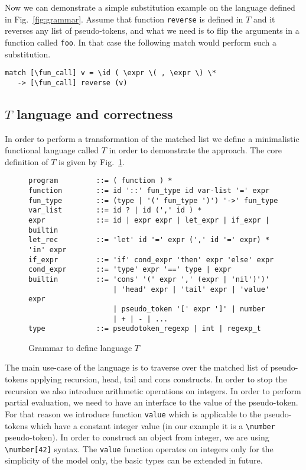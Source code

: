 Now we can demonstrate a simple substitution example on the language
defined in Fig.~\ref{fig:grammar}.  Assume that function \verb|reverse|
is defined in $T$ and it reverses any list of pseudo-tokens, and what
we need is to flip the arguments in a function called \verb|foo|.  In
that case the following match would perform such a substitution.
\begin{verbatim}
match [\fun_call] v = \id ( \expr \( , \expr \) \*
   -> [\fun_call] reverse (v)
\end{verbatim}

\subsection{$T$ language and correctness}
In order to perform a transformation of the matched list we define a
minimalistic functional language called $T$ in order to demonstrate
the approach.  The core definition of $T$ is given by Fig.~\ref{fig:t}.

\begin{figure}
\begin{verbatim}
program         ::= ( function ) *
function        ::= id '::' fun_type id var-list '=' expr
fun_type        ::= (type | '(' fun_type ')') '->' fun_type
var_list        ::= id ? | id (',' id ) *
expr            ::= id | expr expr | let_expr | if_expr | builtin
let_rec         ::= 'let' id '=' expr (',' id '=' expr) * 'in' expr
if_expr         ::= 'if' cond_expr 'then' expr 'else' expr
cond_expr       ::= 'type' expr '==' type | expr
builtin         ::= 'cons' '(' expr ',' (expr | 'nil')')' 
                    | 'head' expr | 'tail' expr | 'value' expr
                    | pseudo_token '[' expr ']' | number
                    | + | - | ...
type            ::= pseudotoken_regexp | int | regexp_t
\end{verbatim}
\caption{\label{fig:t}Grammar to define language $T$}
\end{figure}

The main use-case of the language is to traverse over the matched
list of pseudo-tokens applying recursion, head, tail and cons
constructs.  In order to stop the recursion we also introduce
arithmetic operations on integers.  In order to perform partial
evaluation, we need to have an interface to the value of the
pseudo-token.  For that reason we introduce function \verb|value|
which is applicable to the pseudo-tokens which have a constant
integer value (in our example it is a \verb|\number| pseudo-token).
In order to construct an object from integer, we are using
\verb|\number[42]| syntax.  The \verb|value| function operates
on integers only for the simplicity of the model only, the basic
types can be extended in future.

